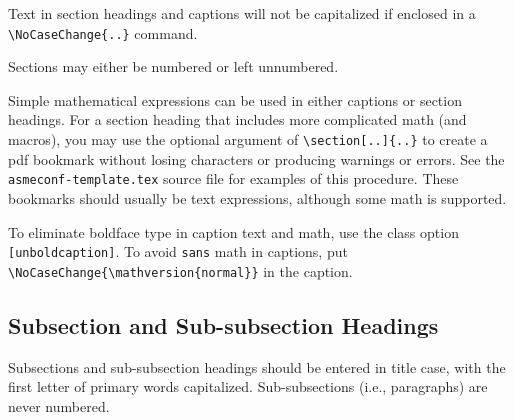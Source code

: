 \documentclass[captionpatch,colorlinks,upint,subscriptcorrection,varvw,german]{asmeconf}
\begin{document}
Text in section headings and captions will not be capitalized if enclosed in a \verb|\NoCaseChange{..}| command.

Sections may either be numbered or left unnumbered.

Simple mathematical expressions can be used in either captions or section headings. For a section heading that includes more complicated math (and macros), you may use the optional argument of \verb|\section[..]{..}| to create a pdf bookmark without losing characters or producing warnings or errors. See the \texttt{asmeconf-template.tex} source file for examples of this procedure. These bookmarks should usually be text expressions, although some math is supported.  

To eliminate boldface type in caption text and math, use the class option \texttt{[unboldcaption]}.  To avoid \texttt{sans} math in captions, put \verb|\NoCaseChange{\mathversion{normal}}| in the caption.

\subsection{Subsection and Sub-subsection Headings}

Subsections and sub-subsection headings should be entered in title case, with the first letter of primary words capitalized. Sub-subsections (i.e., paragraphs) are never numbered.




\begin{table}[t]
\caption[Table]{A simple table}\label{tab:1}
\end{table}

\end{document}

